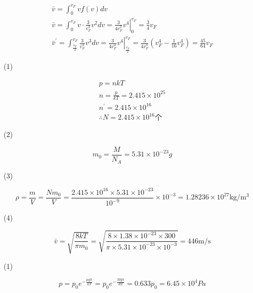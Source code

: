 \documentclass[b5paper,opensource]{./template/qyxf-book}
\begin{document}
$$
\begin{array} { c } { \bar { v } = \int _ { 0 } ^ { v _ { F } } v f ( v ) d v } \\ { \bar { v } = \int _ { 0 } ^ { v _ { F } } v \cdot \frac { 3 } { v _ { F } ^ { 3 } } v ^ { 2 } d v = \left. \frac { 3 } { 4 v _ { F } ^ { 3 } } v ^ { 4 } \right| _ { 0 } ^ { v _ { F } } = \frac { 3 } { 4 } v _ { F } } \\ { \bar { v } ^ { \prime } = \int _ { \frac { v _ { F } } { 2 } } ^ { v _ { F } } \frac { 3 } { v _ { F } ^ { 3 } } v ^ { 3 } d v = \left. \frac { 3 } { 4 v _ { F } ^ { 3 } } v ^ { 4 } \right| _ { \frac { v _ { F } } { 2 } } ^ { v _ { F } } = \frac { 3 } { 4 v _ { F } ^ { 3 } } \left( v _ { F } ^ { 4 } - \frac { 1 } { 16 } v _ { F } ^ { 4 } \right) = \frac { 45 } { 64 } v _ { F } } \end{array}
$$


\solve
(1)

$$
\begin{array} { c } { p = n k T } \\ { n = \frac { p } { k T } = 2.415 \times 10 ^ { 25 } } \\ { n ^ { \prime } = 2.415 \times 10 ^ { 16 } } \\ { \therefore N = 2.415 \times 10 ^ { 16 } \mbox{个} } \end{array}
$$

(2)

$$
m _ { 0 } = \frac { M } { N _ { A } } = 5.31 \times 10 ^ { - 23 } g
$$

(3)

$$
\rho = \frac { m } { V } = \frac { N m _ { 0 } } { V } = \frac { 2.415 \times 10 ^ { 16 } \times 5.31 \times 10 ^ { - 23 } } { 10 ^ { - 9 } } \times 10 ^ { - 3 } = 1.28236 \times 10 ^ { 27 } \mathrm { kg } / \mathrm { m } ^ { 3 }
$$

(4)

$$
\bar { v } = \sqrt { \frac { 8 k T } { \pi m _ { 0 } } } = \sqrt { \frac { 8 \times 1.38 \times 10 ^ { - 23 } \times 300 } { \pi \times 5.31 \times 10 ^ { - 23 } \times 10 ^ { - 3 } } } = 446 \mathrm { m } / \mathrm { s }
$$



\solve

(1)

$$
p = p _ { 0 } e ^ { - \frac { \mu g h } { k T } } = p _ { 0 } e ^ { - \frac { M g h } { R T } } = 0.633 p _ { 0 } = 6.45 \times 10 ^ { 4 } P a
$$
\end{document}
